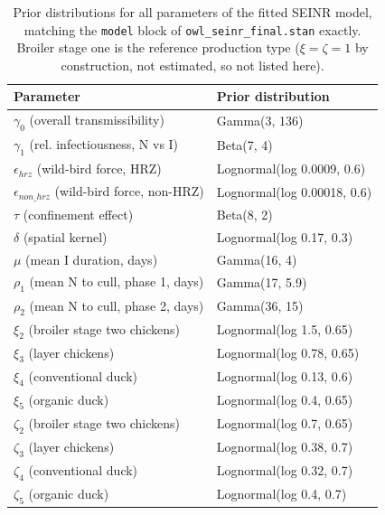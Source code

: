 \begin{table}[t]
\centering
\caption{Prior distributions for all parameters of the fitted SEINR model, matching the \texttt{model} block of \texttt{owl\_seinr\_final.stan} exactly. Broiler stage one is the reference production type ($\xi = \zeta = 1$ by construction, not estimated, so not listed here).}
\label{tab:priors}
\begin{tabular}{ll}
\toprule
Parameter & Prior distribution \\
\midrule
$\gamma_0$ (overall transmissibility) & Gamma(3, 136) \\
$\gamma_1$ (rel. infectiousness, N vs I) & Beta(7, 4) \\
$\epsilon_{hrz}$ (wild-bird force, HRZ) & Lognormal(log 0.0009, 0.6) \\
$\epsilon_{non\_hrz}$ (wild-bird force, non-HRZ) & Lognormal(log 0.00018, 0.6) \\
$\tau$ (confinement effect) & Beta(8, 2) \\
$\delta$ (spatial kernel) & Lognormal(log 0.17, 0.3) \\
$\mu$ (mean I duration, days) & Gamma(16, 4) \\
$\rho_1$ (mean N to cull, phase 1, days) & Gamma(17, 5.9) \\
$\rho_2$ (mean N to cull, phase 2, days) & Gamma(36, 15) \\
$\xi_2$ (broiler stage two chickens) & Lognormal(log 1.5, 0.65) \\
$\xi_3$ (layer chickens) & Lognormal(log 0.78, 0.65) \\
$\xi_4$ (conventional duck) & Lognormal(log 0.13, 0.6) \\
$\xi_5$ (organic duck) & Lognormal(log 0.4, 0.65) \\
$\zeta_2$ (broiler stage two chickens) & Lognormal(log 0.7, 0.65) \\
$\zeta_3$ (layer chickens) & Lognormal(log 0.38, 0.7) \\
$\zeta_4$ (conventional duck) & Lognormal(log 0.32, 0.7) \\
$\zeta_5$ (organic duck) & Lognormal(log 0.4, 0.7) \\
\bottomrule
\end{tabular}
\end{table}

